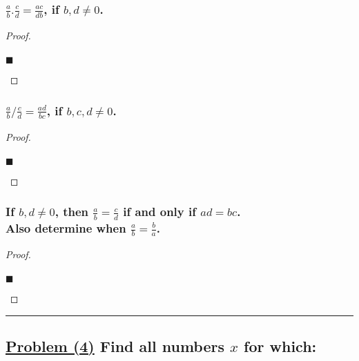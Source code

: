 \documentclass[letterpaper, 10 pt, conference]{ieeeconf}  %
\begin{document}
\subsubsection{\textbf{$\frac{a}{b} . \frac{c}{d} = \frac{ac}{db}$, if $b, d \neq 0$.}}
\begin{proof}
\begin{align}
    
\end{align}
\begin{flushright}
$\blacksquare$
\end{flushright}
\end{proof}

\subsubsection{\textbf{$\frac{a}{b} / \frac{c}{d} = \frac{ad}{bc}$, if $b, c, d \neq 0$.}}
\begin{proof}
\begin{align}
    
\end{align}
\begin{flushright}
$\blacksquare$
\end{flushright}
\end{proof}

\subsubsection{\textbf{If $b, d \neq 0$, then $\frac{a}{b} = \frac{c}{d}$ if and only if $ad = bc$. \\ Also determine when $\frac{a}{b} = \frac{b}{a}$.}}
\begin{proof}
\begin{align}
    
\end{align}
\begin{flushright}
$\blacksquare$
\end{flushright}
\end{proof}

\noindent\rule{8cm}{0.4pt}

\subsection{\textbf{\underline{Problem (4)} Find all numbers $x$ for which: }}
\end{document}

